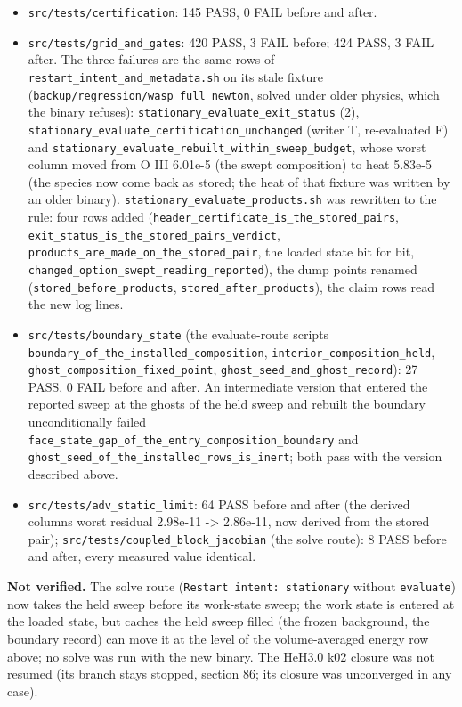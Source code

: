 \documentclass[english,a4paper]{my_memo}
\providecommand{\tightlist}{\setlength{\itemsep}{0pt}\setlength{\parskip}{0pt}}
\begin{document}
\begin{itemize}
\tightlist
\item
  \texttt{src/tests/certification}: 145 PASS, 0 FAIL before and after.
\item
  \texttt{src/tests/grid\_and\_gates}: 420 PASS, 3 FAIL before; 424 PASS, 3 FAIL
  after. The three failures are the same rows of \texttt{restart\_intent\_and\_metadata.sh}
  on its stale fixture (\texttt{backup/regression/wasp\_full\_newton}, solved under
  older physics, which the binary refuses): \texttt{stationary\_evaluate\_exit\_status}
  (2), \texttt{stationary\_evaluate\_certification\_unchanged} (writer T, re-evaluated
  F) and \texttt{stationary\_evaluate\_rebuilt\_within\_sweep\_budget}, whose worst
  column moved from O III 6.01e-5 (the swept composition) to heat 5.83e-5
  (the species now come back as stored; the heat of that fixture was written
  by an older binary). \texttt{stationary\_evaluate\_products.sh} was rewritten to the
  rule: four rows added (\texttt{header\_certificate\_is\_the\_stored\_pairs},
  \texttt{exit\_status\_is\_the\_stored\_pairs\_verdict},
  \texttt{products\_are\_made\_on\_the\_stored\_pair}, the loaded state bit for bit,
  \texttt{changed\_option\_swept\_reading\_reported}), the dump points renamed
  (\texttt{stored\_before\_products}, \texttt{stored\_after\_products}), the claim rows read
  the new log lines.
\item
  \texttt{src/tests/boundary\_state} (the evaluate-route scripts
  \texttt{boundary\_of\_the\_installed\_composition}, \texttt{interior\_composition\_held},
  \texttt{ghost\_composition\_fixed\_point}, \texttt{ghost\_seed\_and\_ghost\_record}): 27 PASS,
  0 FAIL before and after. An intermediate version that entered the
  reported sweep at the ghosts of the held sweep and rebuilt the boundary
  unconditionally failed \texttt{face\_state\_gap\_of\_the\_entry\_composition\_boundary}
  and \texttt{ghost\_seed\_of\_the\_installed\_rows\_is\_inert}; both pass with the
  version described above.
\item
  \texttt{src/tests/adv\_static\_limit}: 64 PASS before and after (the derived
  column\textquotesingle s worst residual 2.98e-11 -\textgreater{} 2.86e-11, now derived from the stored
  pair); \texttt{src/tests/coupled\_block\_jacobian} (the solve route): 8 PASS before
  and after, every measured value identical.
\end{itemize}

\textbf{Not verified.} The solve route (\texttt{Restart\ intent:\ stationary} without
\texttt{evaluate}) now takes the held sweep before its work-state sweep; the work
state is entered at the loaded state, but caches the held sweep filled (the
frozen background, the boundary record) can move it at the level of the
volume-averaged energy row above; no solve was run with the new binary. The HeH3.0 k02
closure was not resumed (its branch stays stopped, section 86; its closure
was unconverged in any case).
\end{document}
